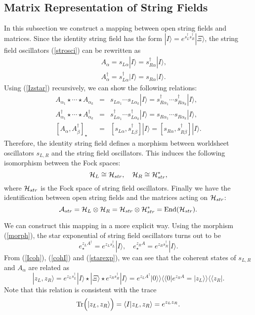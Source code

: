 \documentclass[a4paper,12pt]{article}
\def\Tr{{\rm Tr}}
\def\bra{\langle}
\def\ket{\rangle}
\def\bt{\beta}
\def\al{\alpha}
\def\tens{\otimes}
\def\dag{\dagger}
\def\st{\star}
\def\sd{s^{\dagger}}
\newcommand{\kket}{\rangle\rangle}
\newcommand{\bbra}{\langle\langle}
\begin{document}
\subsection{Matrix Representation of String Fields}
In this subsection we construct a mapping between open string fields
and matrices. Since the identity string field has the form
$|I\ket=e^{\sd_L\sd_R}|\Xi\ket$, the string field oscillators (\ref{strosci})
can be rewritten as
\begin{eqnarray}
 &&A_{\al}=s_{L\al}|I\ket=\sd_{R\al}|I\ket, \\
 &&A^{\dag}_{\al}=\sd_{L\al}|I\ket=s_{R\al}|I\ket.
\end{eqnarray}
Using (\ref{Izstar}) recursively, 
we can show the following relations:
\begin{eqnarray}
 A_{\al_1}\st\cdots\st A_{\al_k}&=&s_{L\al_1}\cdots s_{L\al_k}|I\ket
= \sd_{R\al_1}\cdots \sd_{R\al_k}|I\ket, \\
A_{\al_1}^{\dag}\st\cdots\st A^{\dag}_{\al_k}
&=&\sd_{L\al_1}\cdots \sd_{L\al_k}|I\ket 
=s_{R\al_1}\cdots s_{R\al_k}|I\ket, 
\label{morph}
\\
{}[A_{\al},A^{\dag}_{\bt}]_{\st} &=&[s_{L\al},\sd_{L\bt}]|I\ket
= [s_{R\al},\sd_{R\bt}]|I\ket.
\end{eqnarray}
Therefore, the identity string field defines a morphism 
between worldsheet oscillators $s_{L,R}$ and the string field oscillators.
This induces the following isomorphism between the Fock spaces: 
\begin{equation}
 {\cal H}_L \cong {\cal H}_{str},\quad {\cal H}_R \cong {\cal H}_{str}^*,
\end{equation}
where ${\cal H}_{str}$ is the Fock space of string field oscillators.
Finally we have the identification between open string fields and
the matrices acting on ${\cal H}_{str}$:
\begin{equation}
 {\cal A}_{str}={\cal H}_L\tens {\cal H}_R = {\cal H}_{str}\tens
{\cal H}_{str}^*={\rm End}({\cal H}_{str}).
\end{equation}

We can construct this mapping in a more explicit way.
Using the morphism (\ref{morph}),
the star exponential of string field oscillators
turns out to be
\begin{equation}
 e_{\st}^{z_LA^{\dag}}=e^{z_L\sd_L}|I\ket,\quad 
e_{\st}^{z_RA}=e^{z_R\sd_R}|I\ket.
\label{starexp}
\end{equation}
From (\ref{Icoh}), (\ref{cohI}) and (\ref{starexp}),
we can see that the coherent states of $s_{L,R}$ and $A_{\al}$
are related as
\begin{equation}
 |z_L,z_R\ket= e^{z_L\sd_L}|I\ket\st|\Xi\ket\st e^{z_R\sd_R}|I\ket
=e^{z_LA^{\dag}}|0\kket\bbra0|e^{z_RA}=|z_L\kket\bbra z_R|.
\label{cohsA}
\end{equation}
Note that this relation is consistent with the trace 
\begin{equation}
 \Tr \Big(|z_L,z_R\ket\Big)=\bra I|z_L,z_R\ket=e^{z_Lz_R}.
\end{equation}
\end{document}
